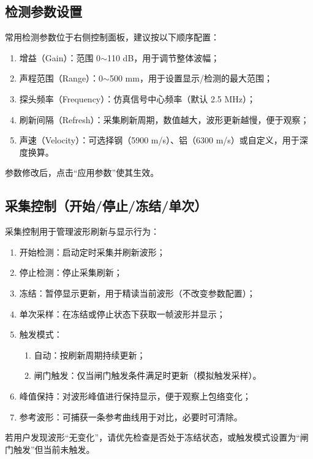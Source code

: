 \subsection{检测参数设置}
\par
常用检测参数位于右侧控制面板，建议按以下顺序配置：
\begin{enumerate}
	\item 增益（Gain）：范围 0$\sim$110 dB，用于调节整体波幅；
	\item 声程范围（Range）：0$\sim$500 mm，用于设置显示/检测的最大范围；
	\item 探头频率（Frequency）：仿真信号中心频率（默认 2.5 MHz）；
	\item 刷新间隔（Refresh）：采集刷新周期，数值越大，波形更新越慢，便于观察；
	\item 声速（Velocity）：可选择钢（5900 m/s）、铝（6300 m/s）或自定义，用于深度换算。
\end{enumerate}
\par
参数修改后，点击“应用参数”使其生效。

\subsection{采集控制（开始/停止/冻结/单次）}
\par
采集控制用于管理波形刷新与显示行为：
\begin{enumerate}
	\item 开始检测：启动定时采集并刷新波形；
	\item 停止检测：停止采集刷新；
	\item 冻结：暂停显示更新，用于精读当前波形（不改变参数配置）；
	\item 单次采样：在冻结或停止状态下获取一帧波形并显示；
	\item 触发模式：
	\begin{enumerate}
		\item 自动：按刷新周期持续更新；
		\item 闸门触发：仅当闸门触发条件满足时更新（模拟触发采样）。
	\end{enumerate}
	\item 峰值保持：对波形峰值进行保持显示，便于观察上包络变化；
	\item 参考波形：可捕获一条参考曲线用于对比，必要时可清除。
\end{enumerate}
\par
若用户发现波形“无变化”，请优先检查是否处于冻结状态，或触发模式设置为“闸门触发”但当前未触发。

